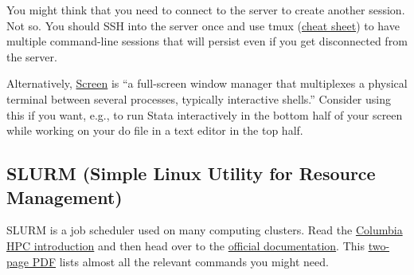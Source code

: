 You might think that you need to connect to the server to create another session.
Not so.
You should SSH into the server once and use tmux (\href{https://tmuxcheatsheet.com/}{cheat sheet}) to have multiple command-line sessions that will persist even if you get disconnected from the server.

Alternatively, 
\href{https://www.gnu.org/software/screen/manual/}{Screen} is ``a full-screen window manager that multiplexes a physical terminal between several processes, typically interactive shells.''
Consider using this if you want, e.g., to run Stata interactively in the bottom half of your screen while working on your do file in a text editor in the top half.


\subsection{SLURM (Simple Linux Utility for Resource Management)}

SLURM is a job scheduler used on many computing clusters.
Read the \href{https://columbiauniversity.atlassian.net/wiki/spaces/rcs/pages/62145124/Insomnia+HPC+Cluster+User+Documentation}{Columbia HPC introduction} and then head over to the \href{https://slurm.schedmd.com/overview.html}{official documentation}.
This \href{https://slurm.schedmd.com/pdfs/summary.pdf}{two-page PDF} lists almost all the relevant commands you might need.

